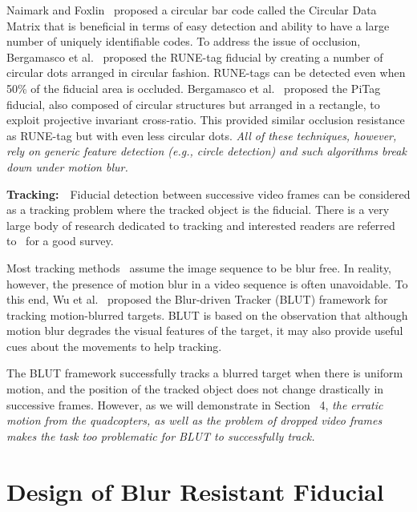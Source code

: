 \documentclass[10pt,twocolumn,letterpaper]{article}
\begin{document}
Naimark and Foxlin~\cite{NaimarkF02} proposed a circular bar code
called the Circular Data Matrix that is beneficial in terms of easy
detection and ability to have a large number of uniquely identifiable
codes.  To address the issue of occlusion, Bergamasco et
al.~\cite{runetag11} proposed the RUNE-tag fiducial by creating a
number of circular dots arranged in circular fashion. RUNE-tags can be
detected even when 50\% of the fiducial area is occluded. Bergamasco
et al.~\cite{Pitag13} proposed the PiTag fiducial, also composed of
circular structures but arranged in a rectangle, to exploit projective
invariant cross-ratio.  This provided similar occlusion resistance as
RUNE-tag but with even less circular dots. {\it All of these techniques,
however, rely on generic feature detection (e.g., circle detection)
and such algorithms break down under motion blur.}


{\textbf{Tracking:}}~~Fiducial detection between successive video
frames can be considered as a tracking problem where the tracked
object is the fiducial.  There is a very large body of research
dedicated to tracking and interested readers are referred
to~\cite{Yilmaz:2006} for a good survey.

Most tracking methods~\cite{Ross:2008,Wu:2009,Perez02,Mei:2009} assume
the image sequence to be blur free. In reality, however, the presence
of motion blur in a video sequence is often unavoidable. To this end,
Wu et al.~\cite{Wu:2011} proposed the Blur-driven Tracker (BLUT)
framework for tracking motion-blurred targets. BLUT is based on the
observation that although motion blur degrades the visual features of
the target, it may also provide useful cues about the movements to
help tracking.

The BLUT framework successfully tracks a blurred target when there is
uniform motion, and the position of the tracked object does not change
drastically in successive frames. However, as we will demonstrate in
Section~ 4, {\it the erratic motion from the quadcopters, as well as the
problem of dropped video frames makes the task too problematic for
BLUT to successfully track.}

\section{Design of Blur Resistant Fiducial}
\end{document}
